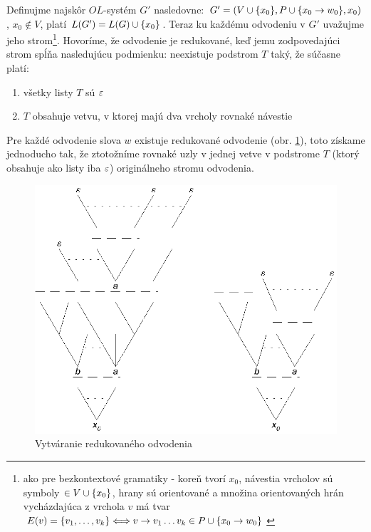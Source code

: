 \begin{dokaz}
    Definujme najskôr $OL$-systém $G'$ nasledovne:
    $G'=(V\cup\{x_0\},P\cup\{x_0\rightarrow w_0\},x_0)$, $x_0\not\in V$, platí
    $L(G')=L(G)\cup \{x_0\}$. Teraz ku každému odvodeniu v $G'$
    uvažujme jeho strom\footnote{ako pre bezkontextové gramatiky -
    koreň tvorí $x_0$,  návestia vrcholov sú symboly $\in
    V\cup\{x_0\}$, hrany sú orientované a množina orientovaných hrán
    vycházdajúca z vrchola $v$ má tvar
    $E(v)=\{v_1,\dots,v_k\}\Longleftrightarrow v\rightarrow v_1\dots v_k\in
    P\cup\{x_0\rightarrow w_0\}$}. Hovoríme, že odvodenie je redukované, keď
    jemu zodpovedajúci strom spĺňa nasledujúcu podmienku: neexistuje
    podstrom $T$ taký, že súčasne platí:
    \begin{enumerate}
    \item všetky listy $T$ sú $\varepsilon$
    \item $T$ obsahuje vetvu, v ktorej majú dva vrcholy rovnaké
    návestie
    \end{enumerate}
    Pre každé odvodenie slova $w$ existuje redukované odvodenie (obr.
    \ref{strom}), toto získame jednoducho tak, že ztotožníme rovnaké
    uzly v jednej vetve v podstrome $T$ (ktorý obsahuje ako listy iba
    $\varepsilon$) originálneho stromu odvodenia.

    \begin{figure}[!ht]
    \centering
    \includegraphics{img/stromy}
    \caption{Vytváranie redukovaného odvodenia} \label{strom}
    \end{figure}


\end{dokaz}
